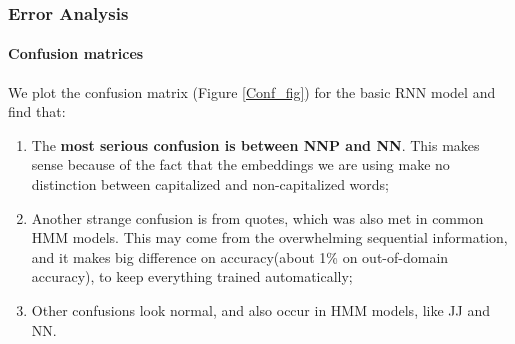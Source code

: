 \documentclass[11pt]{article}
\begin{document}
\subsubsection{Error Analysis}  \label{sec:confm}

\paragraph{Confusion matrices}
We plot the confusion matrix (Figure \ref{Conf_fig}) for the basic RNN model and find that:
\begin{enumerate}
\item The \textbf{most serious confusion is between NNP and NN}. This makes sense because of the fact that the embeddings we are using make no distinction between capitalized and non-capitalized words;
\item  Another strange confusion is from quotes, which was also met in common HMM models. This may come from the overwhelming sequential information, and it makes big difference on accuracy(about 1\% on out-of-domain accuracy), to keep everything trained automatically;
\item Other confusions look normal, and also occur in HMM models, like JJ and NN.
\end{enumerate}
\end{document}

